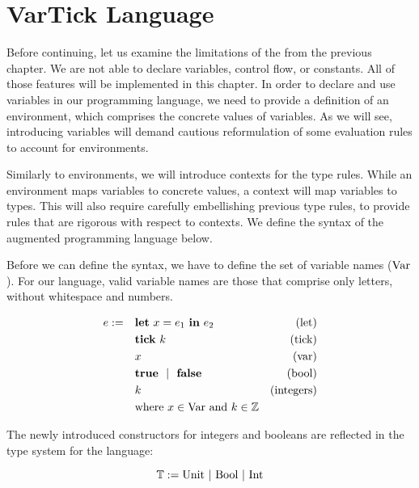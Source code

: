 \chapter{VarTick Language}

Before continuing, let us examine the limitations of the  from the previous chapter. We are not able to declare variables, control flow, or constants. All of those features will be implemented in this chapter. In order to declare and use variables in our programming language, we need to provide a definition of an environment, which comprises the concrete values of variables. As we will see, introducing variables will demand cautious reformulation of some evaluation rules to account for environments.

Similarly to environments, we will introduce contexts for the type rules. While an environment maps variables to concrete values, a context will map variables to types. This will also require carefully embellishing previous type rules, to provide rules that are rigorous with respect to contexts. We define the syntax of the augmented programming language below.

Before we can define the syntax, we have to define the set of variable names (\(\text{Var}\)). For our language, valid variable names are those that comprise only letters, without whitespace and numbers. 

\begin{definition}
   \label{def:prog-lang-5}

\begin{align*}
   e := ~~~ & \mathbf{let}~x = e_1~\mathbf{in}~e_2		& \text{(let)}\\
            & \mathbf{tick}~k				& \text{(tick)}\\
	    & x					& \text{(var)}\\
	    & \mathbf{true} ~~| ~~\mathbf{false}		& \text{(bool)}\\
	    & k					& \text{(integers)}\\
	    & \text{where } x \in \text{Var} \text{ and } k \in \mathbb{Z}
\end{align*}
\end{definition}

The newly introduced constructors for integers and booleans are reflected in the type system for the language:

\begin{definition}\label{def:type-system-5}
   \[
      \mathbb{T} := \text{Unit}~|~\text{\text{Bool}}~|~\text{\text{Int}}
   \]
\end{definition}

